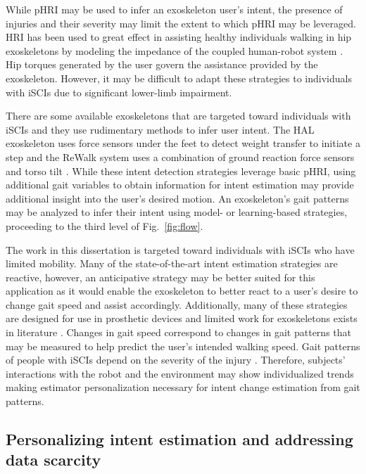 While pHRI may be used to infer an exoskeleton user's intent, the presence of injuries and their severity may limit the extent to which pHRI may be leveraged. HRI has been used to great effect in assisting healthy individuals walking in hip exoskeletons by modeling the impedance of the coupled human-robot system \cite{zhang2019admittance,nagarajan2016integral}. Hip torques generated by the user govern the assistance provided by the exoskeleton. However, it may be difficult to adapt these strategies to individuals with iSCIs due to significant lower-limb impairment. 

There are some available exoskeletons that are targeted toward individuals with iSCIs and they use rudimentary methods to infer user intent. The HAL exoskeleton uses force sensors under the feet to detect weight transfer to initiate a step \cite{suzuki2007intention} and the ReWalk system uses a combination of ground reaction force sensors and torso tilt \cite{goffer2012locomotion}. While these intent detection strategies leverage basic pHRI, using additional gait variables to obtain information for intent estimation may provide additional insight into the user's desired motion. An exoskeleton's gait patterns may be analyzed to infer their intent using model- or learning-based strategies, proceeding to the third level of Fig.~\ref{fig:flow}. 

The work in this dissertation is targeted toward individuals with iSCIs who have limited mobility. Many of the state-of-the-art intent estimation strategies are reactive, however, an anticipative strategy may be better suited for this application as it would enable the exoskeleton to better react to a user's desire to change gait speed and assist accordingly. Additionally, many of these strategies are designed for use in prosthetic devices \cite{young2013classifying,young2015classification,massalin2017user,thatte2019robust} and limited work for exoskeletons exists in literature \cite{medrano2022analysis}. Changes in gait speed correspond to changes in gait patterns that may be measured to help predict the user's intended walking speed. Gait patterns of people with \mbox{iSCIs} depend on the severity of the injury \cite{rota2011walk}. Therefore, subjects' interactions with the robot and the environment may show individualized trends making estimator personalization necessary for intent change estimation from gait patterns. 

\subsection{Personalizing intent estimation and addressing data scarcity}\label{sec:personalization}

